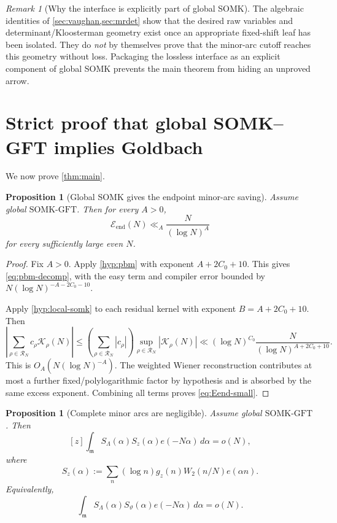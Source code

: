 \documentclass[11pt]{article}
\newtheorem{proposition}[theorem]{Proposition}
\theoremstyle{definition}
\theoremstyle{remark}
\newtheorem{remark}[theorem]{Remark}
\newcommand{\1}{\mathbf 1}
\newcommand{\mcal}{\mathfrak m}
\newcommand{\SOMK}{\mathrm{SOMK}\text{-}\mathrm{GFT}}
\newcommand{\Kl}{\mathcal K}
\newcommand{\Eend}{\mathcal E_{\mathrm{end}}}
\begin{document}
\begin{remark}[Why the interface is explicitly part of global SOMK]
The algebraic identities of \cref{sec:vaughan,sec:mrdet} show that the desired raw variables and determinant/Kloosterman geometry exist once an appropriate fixed-shift leaf has been isolated.  They do \emph{not} by themselves prove that the minor-arc cutoff reaches this geometry without loss.  Packaging the lossless interface as an explicit component of global SOMK prevents the main theorem from hiding an unproved arrow.
\end{remark}

\section{Strict proof that global SOMK--GFT implies Goldbach}\label{sec:somk-to-gold}

We now prove \cref{thm:main}.

\begin{proposition}[Global SOMK gives the endpoint minor-arc saving]\label{prop:somk-minor}
Assume global \(\SOMK\).  Then for every \(A>0\),
\begin{equation}\label{eq:Eend-small}
 \Eend(N)\ll_A\frac{N}{(\log N)^A}
\end{equation}
for every sufficiently large even \(N\).
\end{proposition}

\begin{proof}
Fix \(A>0\).  Apply \cref{hyp:pbm} with exponent \(A+2C_0+10\).  This gives \eqref{eq:pbm-decomp}, with the easy term and compiler error bounded by \(N(\log N)^{-A-2C_0-10}\).

Apply \cref{hyp:local-somk} to each residual kernel with exponent \(B=A+2C_0+10\).  Then
\[
 \left|\sum_{\rho\in\mathscr R_N}c_\rho\Kl_\rho(N)\right|
 \le
 \left(\sum_{\rho\in\mathscr R_N}|c_\rho|\right)
 \sup_{\rho\in\mathscr R_N}|\Kl_\rho(N)|
 \ll
 (\log N)^{C_0}\frac{N}{(\log N)^{A+2C_0+10}}.
\]
This is \(O_A(N(\log N)^{-A})\).  The weighted Wiener reconstruction contributes at most a further fixed/polylogarithmic factor by hypothesis and is absorbed by the same excess exponent.  Combining all terms proves \eqref{eq:Eend-small}.
\end{proof}

\begin{proposition}[Complete minor arcs are negligible]\label{prop:all-minor}
Assume global \(\SOMK\).  Then
\begin{equation}\label{eq:minor-all}
 [z]\int_{\mcal}S_\Lambda(\alpha)S_z(\alpha)e(-N\alpha)\,d\alpha=o(N),
\end{equation}
where
\[
 S_z(\alpha):=\sum_n(\log n)g_z(n)W_2(n/N)e(\alpha n).
\]
Equivalently,
\[
 \int_{\mcal}S_\Lambda(\alpha)S_\vartheta(\alpha)e(-N\alpha)\,d\alpha=o(N).
\]
\end{proposition}
\end{document}
